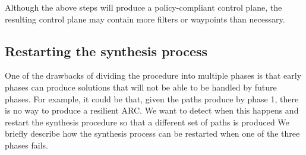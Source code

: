 Although the above steps will produce a policy-compliant control plane, the
resulting control plane may contain more filters or waypoints than necessary.



\subsection{Restarting the synthesis process}
One of the drawbacks of dividing the procedure into multiple phases is that
early phases can produce solutions that will not be able to be handled by future phases.
For example, it could be that, given the paths produce by phase 1, there is no way
to produce a resilient ARC. We want to detect when this happens and restart the synthesis procedure
so that a different set of paths is produced
We briefly describe how the synthesis process can be restarted
when one of the three phases fails.

